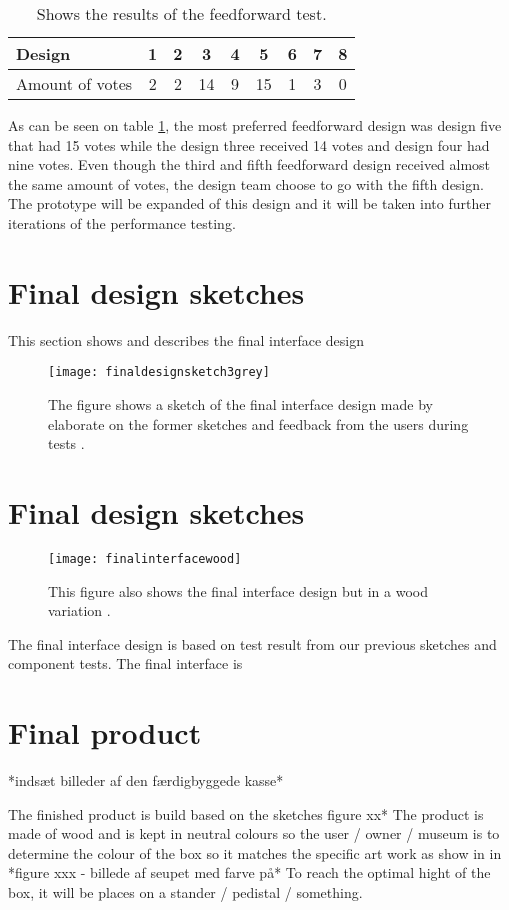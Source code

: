 \begin{table}[!h]
\centering
\caption{Shows the results of the feedforward test.\label{tab:sliderresults}}
\begin{tabular}{|l|c|c|c|c|c|c|c|c|}
\hline
Design & 1 & 2 & 3 & 4 & 5 & 6 & 7 & 8 \\ \hline
Amount of votes & 2 & 2 & 14 & 9 & 15 & 1 & 3 & 0 \\ \hline
\end{tabular}
\end{table}

As can be seen on table \ref{tab:sliderresults}, the most preferred feedforward design was design five that had 15 votes while the design three  received 14 votes and design four had nine votes.
Even though the third and fifth feedforward design received almost the same amount of votes, the design team choose to go with the fifth design. The prototype will be expanded of this design and it will be taken into further iterations of the performance testing. 


\section{Final design sketches}
This section shows and describes the final interface design

\begin{figure}[!h] 
\centering
\texttt{[image: finaldesignsketch3grey]}
\caption{\label{fig:inaldesignsketch3grey} The figure shows a sketch of the final interface design made by elaborate on the former sketches and feedback from the users during tests .}
\end{figure}

\section{Final design sketches}
\begin{figure}[!h] 
\centering
\texttt{[image: finalinterfacewood]}
\caption{\label{fig:finalinterfacewood} This figure also shows the final interface design but in a wood variation .}
\end{figure}
 
 
 The final interface design is based on test result from our previous sketches and component tests. The final interface is 
 
 
 
 \section{Final product }
*indsæt billeder af den færdigbyggede kasse* 

The finished product is build based on the sketches figure xx* The product is made of wood and is kept in neutral colours so the user / owner / museum is to determine the colour of the box so it matches the specific art work as show in in *figure xxx - billede af seupet med farve på* To reach the optimal hight of the box, it will be places on a stander / pedistal / something. 








